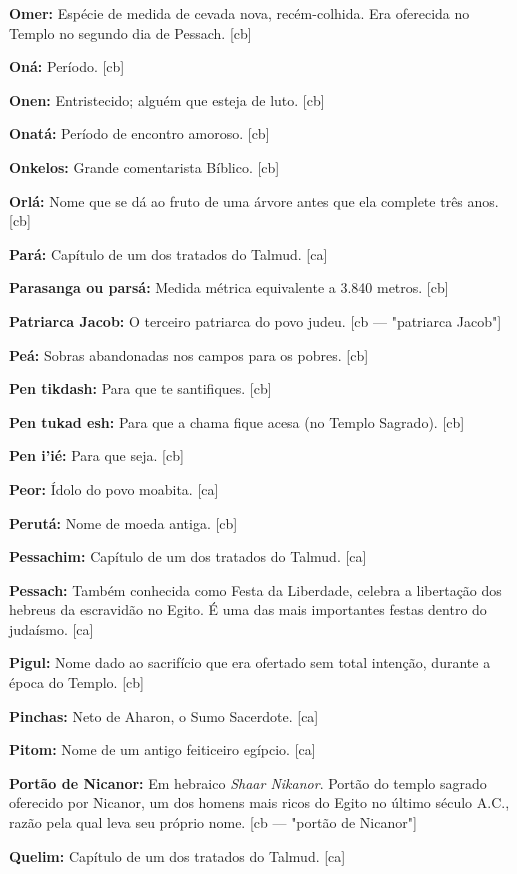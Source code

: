 \textbf{Omer:} Espécie de medida de cevada nova, recém-colhida. 
Era oferecida no Templo no segundo dia de Pessach. [cb]

\textbf{Oná:} Período. [cb]

\textbf{Onen:} Entristecido; alguém que esteja de luto. [cb]

\textbf{Onatá:} Período de encontro amoroso. [cb]

\textbf{Onkelos:} Grande comentarista Bíblico. [cb]

\textbf{Orlá:} Nome que se dá ao fruto de uma árvore antes que 
ela complete três anos. [cb]

\textbf{Pará:} Capítulo de um dos tratados do Talmud. [ca]

\textbf{Parasanga ou parsá:} Medida métrica equivalente a 3.840 metros. [cb]

\textbf{Patriarca Jacob:} O terceiro patriarca do povo judeu. [cb — "patriarca Jacob"]

\textbf{Peá:} Sobras abandonadas nos campos para os pobres. [cb]

\textbf{Pen tikdash:} Para que te santifiques. [cb]

\textbf{Pen tukad esh:} Para que a chama fique acesa (no Templo Sagrado). [cb]

\textbf{Pen i'ié:} Para que seja. [cb]

\textbf{Peor:} Ídolo do povo moabita. [ca]

\textbf{Perutá:} Nome de moeda antiga. [cb]

\textbf{Pessachim:} Capítulo de um dos tratados do Talmud. [ca]

\textbf{Pessach:} Também conhecida como Festa da Liberdade, celebra 
a libertação dos hebreus da escravidão no Egito. É uma das mais 
importantes festas dentro do judaísmo. [ca]

\textbf{Pigul:} Nome dado ao sacrifício que era ofertado sem total
intenção, durante a época do Templo. [cb]

\textbf{Pinchas:} Neto de Aharon, o Sumo Sacerdote. [ca]

\textbf{Pitom:} Nome de um antigo feiticeiro egípcio. [ca]

\textbf{Portão de Nicanor:} Em hebraico \emph{Shaar Nikanor}. 
Portão do templo sagrado oferecido por Nicanor, um dos homens mais ricos 
do Egito no último século A.C., razão pela qual 
leva seu próprio nome. [cb — "portão de Nicanor"]

\textbf{Quelim:} Capítulo de um dos tratados do Talmud. [ca]


